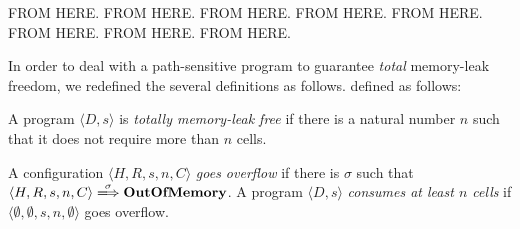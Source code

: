 \begin{itemize}


\end{itemize}

FROM HERE.  FROM HERE.  FROM HERE.  FROM HERE.  FROM HERE.  FROM HERE.
FROM HERE.  FROM HERE.

In order to deal with a path-sensitive program to guarantee
\emph{total} memory-leak freedom, we redefined the several definitions
as follows.  defined as follows:
\begin{myDef}
\label{df:ml}
A program \(\langle D, s \rangle\) is \emph{totally memory-leak free}
if there is a natural number \(n\) such that it does not require more
than \(n\) cells.
\end{myDef}
\begin{myDef}
\label{df:ml}
A configuration \(\langle H, R, s, n, C \rangle\) \emph{goes overflow} if
there is \(\sigma\) such that \(\langle H, R, s, n, C \rangle
\xLongrightarrow{\sigma} \OVERFLOW\).  A program \(\langle D, s
\rangle\) \emph{consumes at least \(n\) cells} if \(\langle \emptyset,
\emptyset, s, n, \emptyset \rangle\) goes overflow.  
\end{myDef}


